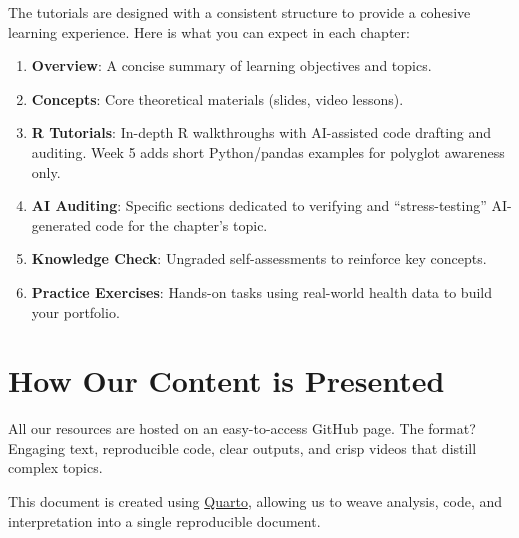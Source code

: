\documentclass[
  letterpaper,
  DIV=11,
  numbers=noendperiod,
  oneside]{scrreprt}
\providecommand{\tightlist}{%
  \setlength{\itemsep}{0pt}\setlength{\parskip}{0pt}}
\begin{document}
\begin{tcolorbox}[enhanced jigsaw, title=\textcolor{quarto-callout-note-color}{\faInfo}\hspace{0.5em}{Note}, arc=.35mm, toptitle=1mm, colframe=quarto-callout-note-color-frame, toprule=.15mm, leftrule=.75mm, bottomtitle=1mm, opacityback=0, bottomrule=.15mm, coltitle=black, breakable, opacitybacktitle=0.6, titlerule=0mm, colback=white, left=2mm, colbacktitle=quarto-callout-note-color!10!white, rightrule=.15mm]

The tutorials are designed with a consistent structure to provide a
cohesive learning experience. Here is what you can expect in each
chapter:

\begin{enumerate}
\def\labelenumi{\arabic{enumi}.}
\tightlist
\item
  \textbf{Overview}: A concise summary of learning objectives and
  topics.
\item
  \textbf{Concepts}: Core theoretical materials (slides, video lessons).
\item
  \textbf{R Tutorials}: In-depth R walkthroughs with AI-assisted code
  drafting and auditing. Week 5 adds short Python/pandas examples for
  polyglot awareness only.
\item
  \textbf{AI Auditing}: Specific sections dedicated to verifying and
  ``stress-testing'' AI-generated code for the chapter's topic.
\item
  \textbf{Knowledge Check}: Ungraded self-assessments to reinforce key
  concepts.
\item
  \textbf{Practice Exercises}: Hands-on tasks using real-world health
  data to build your portfolio.
\end{enumerate}

\end{tcolorbox}

\section*{How Our Content is
Presented}\label{how-our-content-is-presented}


All our resources are hosted on an easy-to-access GitHub page. The
format? Engaging text, reproducible code, clear outputs, and crisp
videos that distill complex topics.

This document is created using \href{https://quarto.org/}{Quarto},
allowing us to weave analysis, code, and interpretation into a single
reproducible document.
\end{document}

